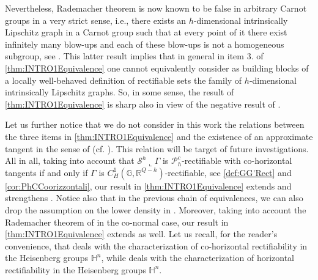 \documentclass[10pt, a4paper,
oneside, headinclude,footinclude]{scrartcl}
\begin{document}
Nevertheless, Rademacher theorem is now known to be false in arbitrary Carnot groups in a very strict sense, i.e., there exists an $h$-dimensional intrinsically Lipschitz graph in a Carnot group such that at every point of it there exist infinitely many blow-ups and each of these blow-ups is not a homogeneous subgroup, see \cite[Theorem 1.1]{JNGV20a}. This latter result implies that in general in item 3. of \cref{thm:INTRO1Equivalence} one cannot equivalently consider as building blocks of a locally well-behaved definition of rectifiable sets the family of $h$-dimensional intrinsically Lipschitz graphs. So, in some sense, the result of \cref{thm:INTRO1Equivalence} is sharp also in view of the negative result of \cite{JNGV20a}.

Let us further notice that we do not consider in this work the relations between the three items in \cref{thm:INTRO1Equivalence} and the existence of an approximate tangent in the sense of \cite[Definition 15.17]{Mattila1995GeometrySpaces} (cf. \cite[Definition 3.7]{MatSerSC}). This relation will be target of future investigations. All in all, taking into account that $\mathcal{S}^h\llcorner\Gamma$ is $\mathscr{P}_h^c$-rectifiable with co-horizontal tangents if and only if $\Gamma$ is $C^1_H(\mathbb G,\mathbb R^{Q-h})$-rectifiable, see \cref{def:GG'Rect} and \cref{cor:PhCCoorizzontali}, our result in \cref{thm:INTRO1Equivalence} extends and strengthens \cite[(i)$\Leftrightarrow$(ii)$\Leftrightarrow$(iv)$\Leftrightarrow$(v) of Theorem 3.15]{MatSerSC}. Notice also that in the previous chain of equivalences, we can also drop the assumption on the lower density in \cite[(iv),(v)]{MatSerSC}. 
Moreover, taking into account the Rademacher theorem of \cite{AM20} in the co-normal case, our result in \cref{thm:INTRO1Equivalence} extends \cite[(i)$\Leftrightarrow$(ii)$\Leftrightarrow$(iv)$\Leftrightarrow$(v) of Theorem 3.14]{MatSerSC} as well. %
Let us recall, for the reader's convenience, that \cite[Theorem 3.15]{MatSerSC} deals with the characterization of co-horizontal rectifiability in the Heisenberg groups $\mathbb H^n$, while \cite[Theorem 3.14]{MatSerSC} 
deals with the characterization of horizontal rectifiability in the Heisenberg groups $\mathbb H^n$.%
\end{document}
